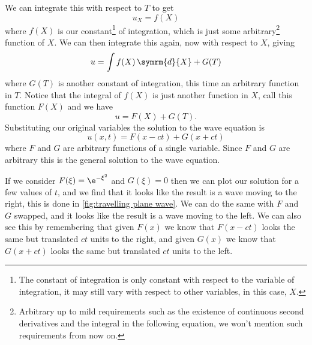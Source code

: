 \documentclass[fleqn]{NotesClass}
\renewcommand{\dd}{\,\symrm{d}}
\begin{document}
    We can integrate this with respect to \(T\) to get
    \begin{equation}
        u_X = f(X)
    \end{equation}
    where \(f(X)\) is our constant\footnote{The constant of integration is only constant with respect to the variable of integration, it may still vary with respect to other variables, in this case, \(X\).} of integration, which is just some arbitrary\footnote{Arbitrary up to mild requirements such as the existence of continuous second derivatives and the integral in the following equation, we won't mention such requirements from now on.} function of \(X\).
    We can then integrate this again, now with respect to \(X\), giving
    \begin{equation}
        u = \int f(X) \dd{X} + G(T)
    \end{equation}
    where \(G(T)\) is another constant of integration, this time an arbitrary function in \(T\).
    Notice that the integral of \(f(X)\) is just another function in \(X\), call this function \(F(X)\) and we have
    \begin{equation}
        u = F(X) + G(T).
    \end{equation}
    Substituting our original variables the solution to the wave equation is
    \begin{equation}
        u(x, t) = F(x - ct) + G(x + ct)
    \end{equation}
    where \(F\) and \(G\) are arbitrary functions of a single variable.
    Since \(F\) and \(G\) are arbitrary this is the general solution to the wave equation.
    
    If we consider \(F(\xi) = \e^{-\xi^2}\) and \(G(\xi) = 0\) then we can plot our solution for a few values of \(t\), and we find that it looks like the result is a wave moving to the right, this is done in \cref{fig:travelling plane wave}.
    We can do the same with \(F\) and \(G\) swapped, and it looks like the result is a wave moving to the left.
    We can also see this by remembering that given \(F(x)\) we know that \(F(x - ct)\) looks the same but translated \(ct\) units to the right, and given \(G(x)\) we know that \(G(x + ct)\) looks the same but translated \(ct\) units to the left.
     
\end{document}
